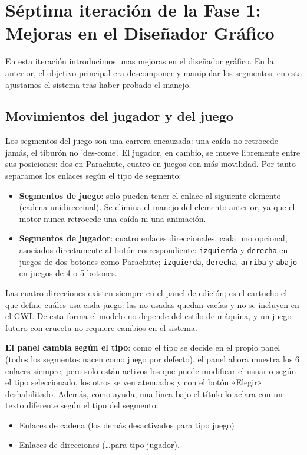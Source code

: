 \section{Séptima iteración de la Fase 1: Mejoras en el Diseñador Gráfico}
\label{sec:MejorasDisenadorGrafico}

En esta iteración introducimos unas mejoras en el diseñador gráfico. En la anterior, el objetivo principal era descomponer y manipular los segmentos; en esta ajustamos el sistema tras haber probado el manejo.

\subsection{Movimientos del jugador y del juego}
Los segmentos del juego son una carrera encauzada: una caída no retrocede jamás, el tiburón no 'des-come'. El jugador, en cambio, se mueve libremente entre sus posiciones: dos en Parachute, cuatro en juegos con más movilidad. Por tanto separamos los enlaces según el tipo de segmento:

\begin{itemize}
	\item \textbf{Segmentos de juego}: solo pueden tener el enlace al siguiente elemento (cadena unidireccinal). Se elimina el manejo del elemento anterior, ya que el motor nunca retrocede una caída ni una animación.
	\item \textbf{Segmentos de jugador}: cuatro enlaces direccionales, cada uno opcional, asociados directamente al botón correspondiente: \texttt{izquierda} y \texttt{derecha} en juegos de dos botones como Parachute; \texttt{izquierda}, \texttt{derecha}, \texttt{arriba} y \texttt{abajo} en juegos de 4 o 5 botones.
\end{itemize}

Las cuatro direcciones existen siempre en el panel de edición; es el cartucho el que define cuáles usa cada juego: las no usadas quedan vacías y no se incluyen en el GWI. De esta forma el modelo no depende del estilo de máquina, y un juego futuro con cruceta no requiere cambios en el sistema.

\textbf{El panel cambia según el tipo}: como el tipo se decide en el propio panel (todos los segmentos nacen como juego por defecto), el panel ahora muestra los 6 enlaces siempre, pero solo están activos los que puede modificar el usuario según el tipo seleccionado, los otros se ven atenuados y con el botón «Elegir» deshabilitado. Además, como ayuda, una línea bajo el título lo aclara con un texto diferente según el tipo del segmento: 
\begin{itemize}
	\item Enlaces de cadena (los demás desactivados para tipo juego)
	\item Enlaces de direcciones (…para tipo jugador).
\end{itemize}

